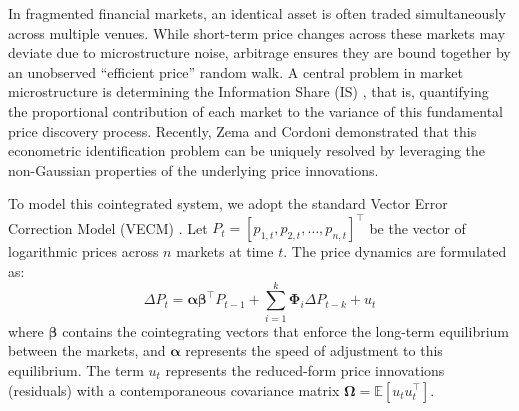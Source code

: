 \documentclass[12pt,a4paper,twoside,openany]{book}
\begin{document}
In fragmented financial markets, an identical asset is often traded simultaneously across multiple venues. 
While short-term price changes across these markets may deviate due to microstructure noise, arbitrage ensures they are bound together by an unobserved ``efficient price'' random walk. 
A central problem in market microstructure is determining the Information Share (IS) \cite{hasbrouck1995, baillie2002}, that is, 
quantifying the proportional contribution of each market to the variance of this fundamental price discovery process. 
Recently, Zema and Cordoni \cite{zema2025} demonstrated that this econometric identification problem can be uniquely resolved by 
leveraging the non-Gaussian properties of the underlying price innovations.

To model this cointegrated system, we adopt the standard Vector Error Correction Model (VECM) \cite{engle1987, johansen1991}. 
Let $P_t = [p_{1,t}, p_{2,t}, \dots, p_{n,t}]^\top$ be the vector of logarithmic prices across $n$ markets at time $t$. The price dynamics are formulated as:
\begin{equation}
    \Delta P_t = \boldsymbol{\alpha} \boldsymbol{\beta}^\top P_{t-1} + \sum_{i=1}^{k} \boldsymbol{\Phi}_i \Delta P_{t-k} + u_t
\end{equation}
where $\boldsymbol{\beta}$ contains the cointegrating vectors that enforce the long-term equilibrium between the markets, 
and $\boldsymbol{\alpha}$ represents the speed of adjustment to this equilibrium. 
The term $u_t$ represents the reduced-form price innovations (residuals) with a contemporaneous covariance matrix $\boldsymbol{\Omega} = \mathbb{E}[u_t u_t^\top]$. 
\end{document}
